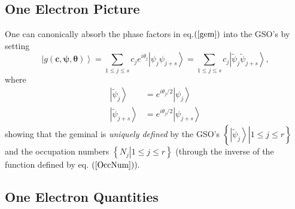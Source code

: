 \documentclass[aps,preprint]{revtex4}%
\begin{document}
\subsection{One Electron Picture\label{OneElecPic}}

One can canonically absorb the phase factors in eq.$\left(  \ref{gem}\right)
$ into the GSO's by setting
\begin{equation}
\left\vert g\left(  \bm{c},\bm{\psi,\theta}\right)  \right\rangle =\sum_{1\leq
j\leq s}c_{j}e^{i\theta_{j}}\left\vert \psi_{j}\psi_{j+s}\right\rangle
=\sum_{1\leq j\leq s}c_{j}\left\vert \tilde{\psi}_{j}\tilde{\psi}%
_{j+s}\right\rangle ,
\end{equation}
where
\begin{align}
\left\vert \tilde{\psi}_{j}\right\rangle  &  =e^{i\theta_{j}/2}\left\vert
\psi_{j}\right\rangle \nonumber\\
\left\vert \tilde{\psi}_{j+s}\right\rangle  &  =e^{i\theta_{j}/2}\left\vert
\psi_{j+s}\right\rangle
\end{align}
showing that the geminal is \emph{uniquely defined} by the GSO's $\left\{
\left.  \left\vert \tilde{\psi}_{j}\right\rangle \right\vert 1\leq j\leq
r\right\}  $ and the occupation numbers $\left\{  \left.  N_{j}\right\vert
1\leq j\leq r\right\}  $ (through the inverse of the function defined by eq.
$\left(  \ref{OccNum}\right)  ).$

\subsection{One Electron Quantities\label{OEP}}
\end{document}
